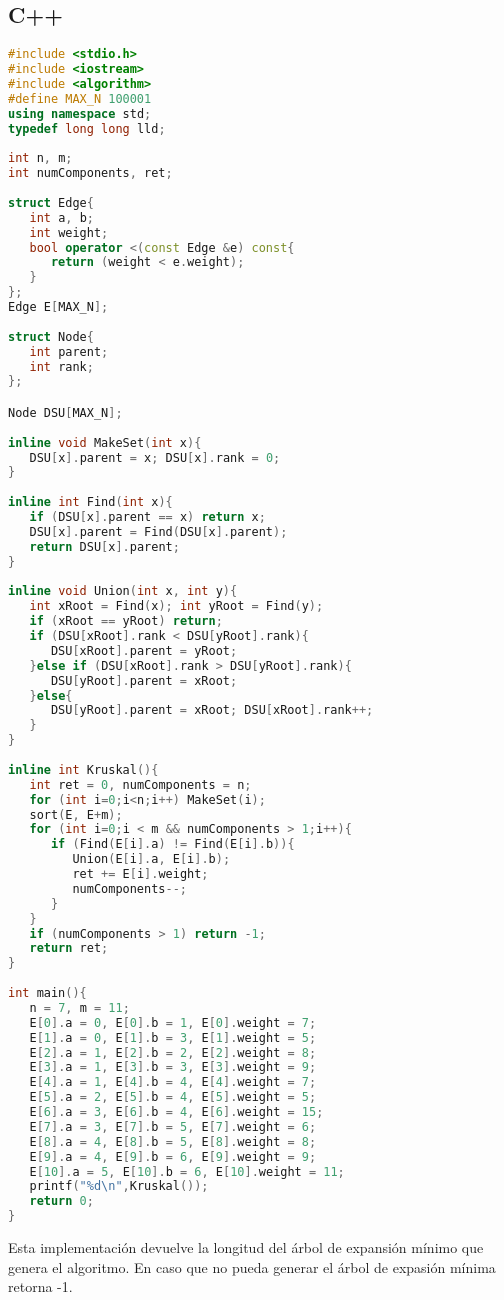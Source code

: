 \subsection{C++}

\begin{lstlisting}[language=C++]
#include <stdio.h>
#include <iostream>
#include <algorithm>
#define MAX_N 100001
using namespace std;
typedef long long lld;
	
int n, m;
int numComponents, ret;
	
struct Edge{
   int a, b;
   int weight;
   bool operator <(const Edge &e) const{
      return (weight < e.weight);
   }
};
Edge E[MAX_N];
	
struct Node{
   int parent;
   int rank;
};

Node DSU[MAX_N];
	
inline void MakeSet(int x){
   DSU[x].parent = x; DSU[x].rank = 0;
}
	
inline int Find(int x){
   if (DSU[x].parent == x) return x;
   DSU[x].parent = Find(DSU[x].parent);
   return DSU[x].parent;
}
	
inline void Union(int x, int y){
   int xRoot = Find(x); int yRoot = Find(y);
   if (xRoot == yRoot) return;
   if (DSU[xRoot].rank < DSU[yRoot].rank){
      DSU[xRoot].parent = yRoot;
   }else if (DSU[xRoot].rank > DSU[yRoot].rank){
      DSU[yRoot].parent = xRoot;
   }else{
      DSU[yRoot].parent = xRoot; DSU[xRoot].rank++;
   }
}
	
inline int Kruskal(){
   int ret = 0, numComponents = n;
   for (int i=0;i<n;i++) MakeSet(i);
   sort(E, E+m);
   for (int i=0;i < m && numComponents > 1;i++){
      if (Find(E[i].a) != Find(E[i].b)){
         Union(E[i].a, E[i].b);
         ret += E[i].weight;
         numComponents--;
      }
   }
   if (numComponents > 1) return -1;
   return ret;
}
	
int main(){
   n = 7, m = 11;
   E[0].a = 0, E[0].b = 1, E[0].weight = 7;
   E[1].a = 0, E[1].b = 3, E[1].weight = 5;
   E[2].a = 1, E[2].b = 2, E[2].weight = 8;
   E[3].a = 1, E[3].b = 3, E[3].weight = 9;
   E[4].a = 1, E[4].b = 4, E[4].weight = 7;
   E[5].a = 2, E[5].b = 4, E[5].weight = 5;
   E[6].a = 3, E[6].b = 4, E[6].weight = 15;
   E[7].a = 3, E[7].b = 5, E[7].weight = 6;
   E[8].a = 4, E[8].b = 5, E[8].weight = 8;
   E[9].a = 4, E[9].b = 6, E[9].weight = 9;
   E[10].a = 5, E[10].b = 6, E[10].weight = 11;
   printf("%d\n",Kruskal());
   return 0;
}
\end{lstlisting} 

Esta implementación devuelve la longitud del árbol de expansión mínimo que genera el algoritmo. En caso que no pueda generar el árbol de expasión mínima retorna -1.

